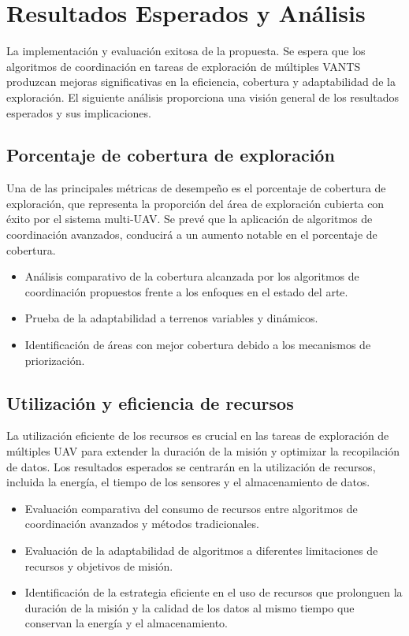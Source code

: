 \documentclass[sigconf]{acmart}
\begin{document}
\section{Resultados Esperados y Análisis}

La implementación y evaluación exitosa de la propuesta. Se espera que los algoritmos de coordinación en tareas de exploración de múltiples VANTS produzcan mejoras significativas en la eficiencia, cobertura y adaptabilidad de la exploración. El siguiente análisis proporciona una visión general de los resultados esperados y sus implicaciones.

\subsection*{Porcentaje de cobertura de exploración}

Una de las principales métricas de desempeño es el porcentaje de cobertura de exploración, que representa la proporción del área de exploración cubierta con éxito por el sistema multi-UAV. Se prevé que la aplicación de algoritmos de coordinación avanzados, conducirá a un aumento notable en el porcentaje de cobertura.

\begin{itemize}
\item Análisis comparativo de la cobertura alcanzada por los algoritmos de coordinación propuestos frente a los enfoques en el estado del arte.
\item Prueba de la adaptabilidad a terrenos variables y dinámicos.
\item Identificación de áreas con mejor cobertura debido a los mecanismos de priorización.
\end{itemize}
  
\subsection*{Utilización y eficiencia de recursos}

La utilización eficiente de los recursos es crucial en las tareas de exploración de múltiples UAV para extender la duración de la misión y optimizar la recopilación de datos. Los resultados esperados se centrarán en la utilización de recursos, incluida la energía, el tiempo de los sensores y el almacenamiento de datos.

\begin{itemize}
\item Evaluación comparativa del consumo de recursos entre algoritmos de coordinación avanzados y métodos tradicionales.
  
\item Evaluación de la adaptabilidad de algoritmos a diferentes limitaciones de recursos y objetivos de misión.
  
\item Identificación de la estrategia eficiente en el uso de recursos que prolonguen la duración de la misión y la calidad de los datos al mismo tiempo que conservan la energía y el almacenamiento.
  
\end{itemize}
\end{document}
